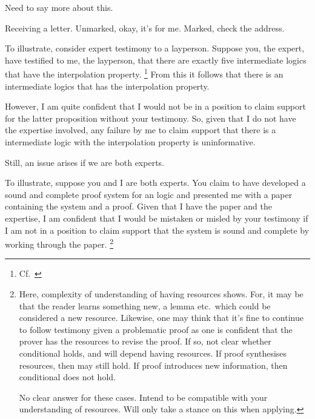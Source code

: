 \begin{note}
  \color{red}
  Need to say more about this.
\end{note}

\begin{note}
  Receiving a letter.
  Unmarked, okay, it's for me.
  Marked, check the address.
\end{note}

\begin{note}
  To illustrate, consider expert testimony to a layperson.
  Suppose you, the expert, have testified to me, the layperson, that there are exactly five intermediate logics that have the interpolation property.\nolinebreak
  \footnote{Cf.\ \textcite{Maksimova:1977un}}
  From this it follows that there is an intermediate logics that has the interpolation property.

  However, I am quite confident that I would not be in a position to claim support for the latter proposition without your testimony.
  So, given that I do not have the expertise involved, any failure by me to claim support that there is a intermediate logic with the interpolation property is uninformative.
\end{note}

\begin{note}
  Still, an issue arises if we are both experts.

  To illustrate, suppose you and I are both experts.
  You claim to have developed a sound and complete proof system for an logic and presented me with a paper containing the system and a proof.
  Given that I have the paper and the expertise, I am confident that I would be mistaken or misled by your testimony if I am not in a position to claim support that the system is sound and complete by working through the paper.\nolinebreak
  \footnote{
    Here, complexity of understanding of having resources shows.
    For, it may be that the reader learns something new, a lemma etc.\ which could be considered a new resource.
    Likewise, one may think that it's fine to continue to follow testimony given a problematic proof as one is confident that the prover has the resources to revise the proof.
    If so, not clear whether conditional holds, and will depend having resources.
    If proof synthesises resources, then may still hold.
    If proof introduces new information, then conditional does not hold.

    No clear answer for these cases.
    Intend to be compatible with your understanding of resources.
    Will only take a stance on this when applying.
  }
\end{note}

